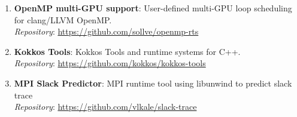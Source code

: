 \begin{enumerate}
\item \textbf{OpenMP multi-GPU support}: User-defined multi-GPU  loop scheduling for clang/LLVM OpenMP. \\ \textit{Repository}: \url{https://github.com/sollve/openmp-rts}
\item \textbf{Kokkos Tools}: Kokkos Tools and runtime systems for C++.\\ \textit{Repository}: \url{https://github.com/kokkos/kokkos-tools}
\item \textbf{MPI Slack Predictor}: MPI runtime tool using libunwind to predict slack trace \\ \textit{Repository}: \url{https://github.com/vlkale/slack-trace}
\end{enumerate}
